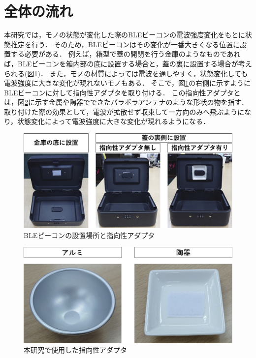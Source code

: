 \section{全体の流れ}
本研究では，モノの状態が変化した際のBLEビーコンの電波強度変化をもとに状態推定を行う．
そのため，BLEビーコンはその変化が一番大きくなる位置に設置する必要がある．
例えば，箱型で蓋の開閉を行う金庫のようなものであれば，BLEビーコンを箱内部の底に設置する場合と，蓋の裏に設置する場合が考えられる(図\ref{adapter})．
また，モノの材質によっては電波を通しやすく，状態変化しても電波強度に大きな変化が現れないモノもある．
そこで，図\ref{adapter}の右側に示すようにBLEビーコンに対して指向性アダプタを取り付ける．
この指向性アダプタとは，図\ref{adapter_only}に示す金属や陶器でできたパラボラアンテナのような形状の物を指す．
取り付けた際の効果として，電波が拡散せず収束して一方向のみへ飛ぶようになり，状態変化によって電波強度に大きな変化が現れるようになる．


\begin{figure}[H]
    \centering
    \includegraphics[width=12cm]{images/chapter3/adapta_compare.jpg}
    \caption{BLEビーコンの設置場所と指向性アダプタ}
    \label{adapter}
\end{figure}


\begin{figure}[H]
    \centering
    \includegraphics[width=12cm]{images/chapter3/adapta.jpg}
    \caption{本研究で使用した指向性アダプタ}
    \label{adapter_only}
\end{figure}


